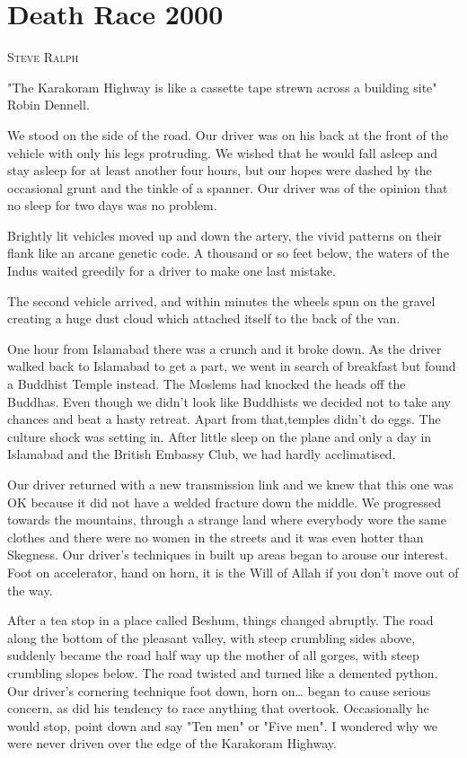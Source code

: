 \documentclass[a5paper,openany,font 10pt]{scrbook}
\makeatletter
\newcommand{\chapterauthor}[1]{%
{\parindent0pt\vspace*{-5pt}%
\linespread{1.1}\large\scshape#1%
\par\nobreak\vspace*{35pt}}
\@afterheading%
}
\makeatother
\begin{document}
\chapter{Death Race 2000}
\label{sec:org4d0ff85}
\chapterauthor{Steve Ralph}

"The Karakoram Highway is like a cassette tape strewn across
a building site"   Robin Dennell.

We stood on the side of the road. Our driver was on his back
at the front of the vehicle with only his legs protruding. We
wished that he would fall asleep and stay asleep for at least
another four hours, but our hopes were dashed by the occasional
grunt and the tinkle of a spanner.  Our driver was of the opinion
that no sleep for two days was no problem.

Brightly lit vehicles moved up and down the artery, the
vivid patterns on their flank like an arcane genetic code. A
thousand or so feet below, the waters of the Indus waited
greedily for a driver to make one last mistake.

The second vehicle arrived, and within minutes the wheels
spun on the gravel creating a huge dust cloud which attached
itself to the back of the van.

One hour from Islamabad there was a crunch and it broke
down. As the driver walked back to Islamabad to get a part, we
went in search of breakfast but found a Buddhist Temple instead.
The Moslems had knocked the heads off the Buddhas. Even though we
didn't look like Buddhists we decided not to take any chances and
beat a hasty retreat. Apart from that,temples didn't do eggs. The
culture shock was setting in. After little sleep on the plane and
only a day in Islamabad and the British Embassy Club, we had
hardly acclimatised.

Our driver returned with a new transmission link and we knew
that this one was OK because it did not have a welded fracture
down the middle. We progressed towards the mountains, through a
strange land where everybody wore the same clothes and there were
no women in the streets and it was even hotter than Skegness. Our
driver's techniques in built up areas began to arouse our
interest. Foot on accelerator, hand on horn, it is the Will of
Allah if you don't move out of the way.

After a tea stop in a place called Beshum, things changed
abruptly. The road along the bottom of the pleasant valley, with
steep crumbling sides above, suddenly became the road half way up
the mother of all gorges, with steep crumbling slopes below. The
road twisted and turned like a demented python. Our driver's
cornering technique  foot down, horn on\ldots{}  began to cause
serious concern, as did his tendency to race anything that
overtook. Occasionally he would stop, point down and say "Ten
men" or "Five men". I wondered why we were never driven over the
edge of the Karakoram Highway.
\end{document}
